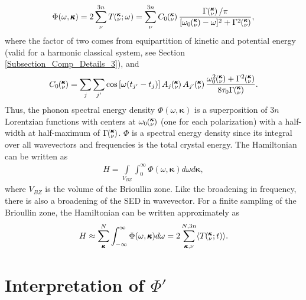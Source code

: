 \documentclass[letterpaper,12pt]{article}
\newcommand{\kvt}{\mspace{-4.0mu}\left(\mspace{-8.0mu}\begin{smallmatrix}&\pmb{\kappa} \\&\nu\end{smallmatrix}\mspace{-2.0mu};t\right)}
\newcommand{\kvw}{\mspace{-4.0mu}\left(\mspace{-8.0mu}\begin{smallmatrix}&\pmb{\kappa} \\&\nu\end{smallmatrix}\mspace{-2.0mu};\omega\right)}
\newcommand{\kv}{\mspace{-4.0mu}\left(\mspace{-8.0mu}\begin{smallmatrix}&\pmb{\kappa} \\&\nu\end{smallmatrix}\mspace{-3.0mu}\right)}
\begin{document}
\begin{equation}\label{A:E:Lorentzian_NMD}
\begin{split}
\Phi(\omega,\pmb{\kappa}) = 2\sum_{\nu}^{3n} T\kvw=\sum_{\nu}^{3n}C_0\kv\frac{\Gamma\kv/\pi}{[\omega_0\kv-\omega]^2+\Gamma^2\kv},
\end{split}
\end{equation}
where the factor of two comes from equipartition of kinetic and potential energy (valid for a harmonic classical system, see Section \ref{Subsection_Comp_Details_3}), and
\begin{equation}\label{A:E:C_0}
\begin{split}
C_0\kv = \sum_j\sum_{j'}\cos\left[\omega (t_{j'}-t_j)\right]A_j\kv A_{j'}\kv\frac{\omega_0^2\kv+\Gamma^2\kv}{8\tau_0\Gamma\kv}.
\end{split}
\end{equation}
Thus, the phonon spectral energy density $\Phi(\omega,\pmb{\kappa})$ is a superposition of $3n$ Lorentzian
functions with centers at $\omega_0\kv$ (one for each polarization) with a half-width at half-maximum of
$\Gamma\kv$. $\Phi$ is a spectral energy density since its integral over all wavevectors and frequencies is the total crystal energy. The Hamiltonian can be written as
\begin{equation}\label{A:E:equipartition}
\begin{split}
H=\int\limits_{V_{BZ}} \int_{0}^{\infty}\Phi(\omega,\pmb{\kappa})d\omega d\pmb{\kappa},
\end{split}
\end{equation}
where $V_{BZ}$ is the volume of the Brioullin zone.  Like the broadening in frequency, there is also a broadening of the SED in wavevector.\cite{turneythesis} For a finite sampling of the Brioullin zone, the Hamiltonian can be written approximately as
\begin{equation}\label{A:E:equipartition}
\begin{split}
H \approx \sum_{\pmb{\kappa}}^N \int_{-\infty}^{\infty}\Phi(\omega,\pmb{\kappa})d\omega = 2\sum_{\pmb{\kappa},\nu}^{N,3n}\langle T\kvt\rangle.
\end{split}
\end{equation}

\section{\label{Appendix_B}Interpretation of $\Phi'$}
\end{document}

